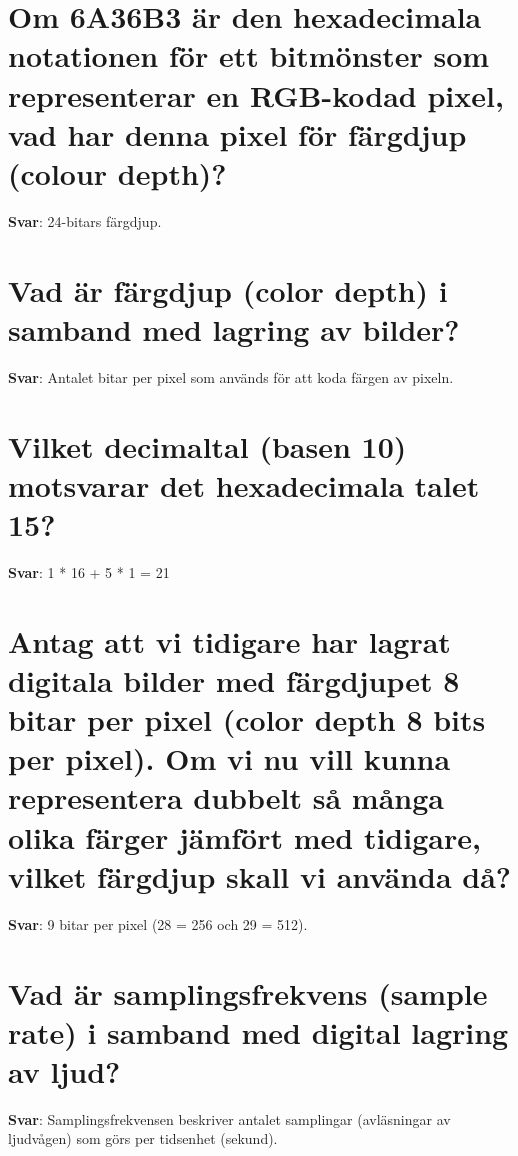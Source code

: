 \documentclass[a4paper,11pt,oneside]{book}
\begin{document}
\begin{sloppypar}
\section{Om 6A36B3 \"ar den hexadecimala notationen f\"or ett bitm\"onster som representerar en RGB-kodad pixel, vad har denna pixel f\"or f\"argdjup (colour depth)?}

\label{q:72:sa:sv:True}

\textbf{Svar}: 24-bitars f\"argdjup.



\section{Vad \"ar f\"argdjup (color depth) i samband med lagring av bilder?}

\label{q:73:sa:sv:True}

\textbf{Svar}: Antalet bitar per pixel som anv\"ands f\"or att koda f\"argen av pixeln.



\section{Vilket decimaltal (basen 10) motsvarar det hexadecimala talet 15?}

\label{q:74:sa:sv:True}

\textbf{Svar}: 1 * 16 + 5 * 1 = 21



\section{Antag att vi tidigare har lagrat digitala bilder med f\"argdjupet 8 bitar per pixel (color depth 8 bits per pixel). Om vi nu vill kunna representera dubbelt s\r{a} m\r{a}nga olika f\"arger j\"amf\"ort med tidigare, vilket f\"argdjup skall vi anv\"anda d\r{a}?}

\label{q:76:sa:sv:True}

\textbf{Svar}: 9 bitar per pixel (28 = 256 och 29 = 512).



\section{Vad \"ar samplingsfrekvens (sample rate) i samband med digital lagring av ljud?}

\label{q:77:sa:sv:True}

\textbf{Svar}: Samplingsfrekvensen beskriver antalet samplingar (avl\"asningar av ljudv\r{a}gen) som g\"ors per tidsenhet (sekund).




\end{sloppypar}
\end{document}
